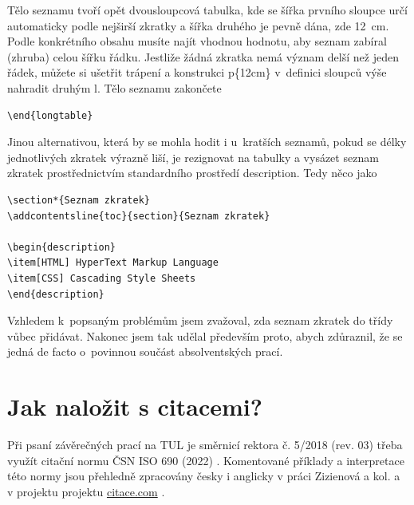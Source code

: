 \documentclass[FM,BP]{tulthesis}
\newcommand{\argument}[1]{{\ttfamily\color{\tulcolor}#1}}
\newenvironment{myquote}{\begin{list}{}{\setlength\leftmargin\parindent}\item[]}{\end{list}}
\newenvironment{listing}{\begin{myquote}\color{\tulcolor}}{\end{myquote}}
\begin{document}
Tělo seznamu tvoří opět dvousloupcová tabulka, kde se šířka prvního sloupce
určí automaticky podle nejširší zkratky a šířka druhého je pevně dána, zde
12~cm. Podle konkrétního obsahu musíte najít vhodnou hodnotu, aby seznam
zabíral (zhruba) celou šířku řádku. Jestliže žádná zkratka nemá význam delší
než jeden řádek, můžete si ušetřit trápení a konstrukci \argument{p\{12cm\}}
v~definici sloupců výše nahradit druhým \argument{l}. Tělo seznamu zakončete

\begin{listing}
\begin{verbatim}
\end{longtable}
\end{verbatim}
\end{listing}

Jinou alternativou, která by se mohla hodit i u~kratších seznamů, pokud se
délky jednotlivých zkratek výrazně liší, je rezignovat na tabulky a vysázet
seznam zkratek prostřednictvím standardního prostředí \argument{description}.
Tedy něco jako

\begin{listing}
\begin{verbatim}
\section*{Seznam zkratek}
\addcontentsline{toc}{section}{Seznam zkratek}

\begin{description}
\item[HTML] HyperText Markup Language
\item[CSS] Cascading Style Sheets
\end{description}
\end{verbatim}
\end{listing}

Vzhledem k~popsaným problémům jsem zvažoval, zda seznam zkratek do třídy vůbec
přidávat. Nakonec jsem tak udělal především proto, abych zdůraznil, že se jedná
de facto o~povinnou součást absolventských prací.

\chapter{Jak naložit s citacemi?}

Při psaní závěrečných prací na TUL je směrnicí rektora č. 5/2018 (rev. 03) třeba využít citační normu ČSN ISO 690 (2022) \cite{csniso690_2022}. Komentované příklady a interpretace této normy jsou  přehledně zpracovány česky i anglicky v práci Zizienová a kol.  a v projektu projektu \hyperlink{citace.com}{citace.com} \cite{Zizienova2023CZ,Zizienova2023EN,webCitaceCOM}.
\end{document}
